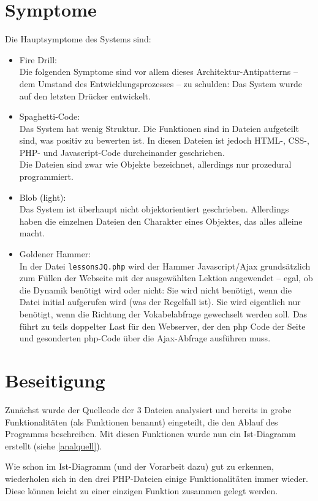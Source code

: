 \documentclass{scrartcl}
\begin{document}
\section{Symptome}
Die Hauptsymptome des Systems sind:
\begin{itemize}
\item Fire Drill:\\
Die folgenden Symptome sind vor allem dieses Architektur-Antipatterns -- dem Umstand des Entwicklungsprozesses -- zu schulden: Das System wurde auf den letzten Drücker entwickelt. 
\item Spaghetti-Code:\\
Das System hat wenig Struktur. Die Funktionen sind in Dateien aufgeteilt sind, was positiv zu bewerten ist. In diesen Dateien ist jedoch HTML-, CSS-, PHP- und Javascript-Code durcheinander geschrieben.\\
Die Dateien sind zwar wie Objekte bezeichnet, allerdings nur prozedural programmiert.
\item Blob (light):\\
Das System ist überhaupt nicht objektorientiert geschrieben. Allerdings haben die einzelnen Dateien den Charakter eines Objektes, das alles alleine macht.
\item Goldener Hammer:\\
In der Datei \lstinline`lessonsJQ.php` wird der Hammer Javascript/Ajax grundsätzlich zum Füllen der Webseite mit der ausgewählten Lektion angewendet -- egal, ob die Dynamik benötigt wird oder nicht: Sie wird nicht benötigt, wenn die Datei initial aufgerufen wird (was der Regelfall ist). Sie wird eigentlich nur benötigt, wenn die Richtung der Vokabelabfrage gewechselt werden soll. Das führt zu teils doppelter Last für den Webserver, der den php Code der Seite und gesonderten php-Code über die Ajax-Abfrage ausführen muss.
\end{itemize}


\section{Beseitigung}

Zunächst wurde der Quellcode der 3 Dateien analysiert und bereits in grobe Funktionalitäten (als Funktionen benannt) eingeteilt, die den Ablauf des Programms beschreiben. Mit diesen Funktionen wurde nun ein Ist-Diagramm erstellt (siehe \autoref{analquell}).

Wie schon im Ist-Diagramm (und der Vorarbeit dazu) gut zu erkennen, wiederholen sich in den drei PHP-Dateien einige Funktionalitäten immer wieder. Diese können leicht zu einer einzigen Funktion zusammen gelegt werden. 
\end{document}

